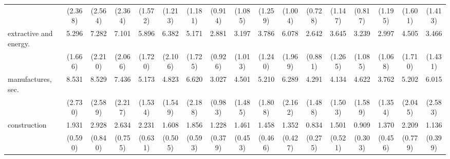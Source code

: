 {\begin{tabular}{l*{16}{c}}
                    &     (2.368)         &     (2.564)         &     (2.364)         &     (1.572)         &     (1.213)         &     (1.181)         &     (0.914)         &     (1.085)         &     (1.259)         &     (1.004)         &     (0.728)         &     (1.147)         &     (0.817)         &     (1.195)         &     (1.601)         &     (1.413)         \\
[1em]
extractive and energy.&       5.296\sym{***}&       7.282\sym{***}&       7.101\sym{***}&       5.896\sym{***}&       6.382\sym{***}&       5.171\sym{***}&       2.881\sym{***}&       3.197\sym{***}&       3.786\sym{***}&       6.078\sym{***}&       2.642\sym{**} &       3.645\sym{***}&       3.239\sym{***}&       2.997\sym{**} &       4.505\sym{***}&       3.466\sym{**} \\
                    &     (1.666)         &     (2.210)         &     (2.066)         &     (1.720)         &     (2.106)         &     (1.725)         &     (0.926)         &     (1.013)         &     (1.240)         &     (1.969)         &     (0.881)         &     (1.265)         &     (1.085)         &     (1.068)         &     (1.710)         &     (1.431)         \\
[1em]
manufactures, sec.  &       8.531\sym{***}&       8.529\sym{***}&       7.436\sym{***}&       5.173\sym{***}&       4.823\sym{***}&       6.620\sym{***}&       3.027\sym{***}&       4.501\sym{***}&       5.210\sym{***}&       6.289\sym{***}&       4.291\sym{***}&       4.134\sym{***}&       4.622\sym{***}&       3.762\sym{***}&       5.202\sym{***}&       6.015\sym{***}\\
                    &     (2.730)         &     (2.589)         &     (2.217)         &     (1.534)         &     (1.549)         &     (2.188)         &     (0.983)         &     (1.485)         &     (1.808)         &     (2.162)         &     (1.488)         &     (1.503)         &     (1.589)         &     (1.354)         &     (2.045)         &     (2.583)         \\
[1em]
construction        &       1.931\sym{*}  &       2.928\sym{***}&       2.634\sym{***}&       2.231\sym{**} &       1.608         &       1.856         &       1.228         &       1.461         &       1.458         &       1.352         &       0.834         &       1.501         &       0.909         &       1.370         &       2.209\sym{*}  &       1.136         \\
                    &     (0.590)         &     (0.840)         &     (0.755)         &     (0.631)         &     (0.505)         &     (0.593)         &     (0.379)         &     (0.453)         &     (0.466)         &     (0.427)         &     (0.275)         &     (0.521)         &     (0.303)         &     (0.456)         &     (0.779)         &     (0.399)         \\

\end{tabular}}
